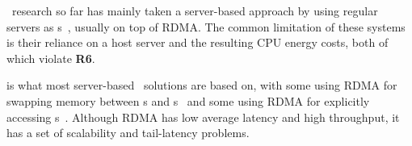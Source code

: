 \md\ research so far has mainly taken a server-based approach by using regular servers as \MN{}s~\cite{InfiniSwap,FastSwap,Semeru,Shan18-OSDI,AIFM,zombieland,FaRM},
usually on top of RDMA.
The common limitation of these systems is their reliance on a host server and the resulting CPU energy costs, both of which violate \textbf{R6}.

 is what most server-based \md\ solutions are based on, with some using RDMA for swapping memory between \CN{}s and \MN{}s~\cite{InfiniSwap,FastSwap,Semeru} and some using RDMA for explicitly accessing \MN{}s~\cite{AIFM,zombieland,FaRM}.
Although RDMA has low average latency and high throughput, it has a set of scalability and tail-latency problems.

